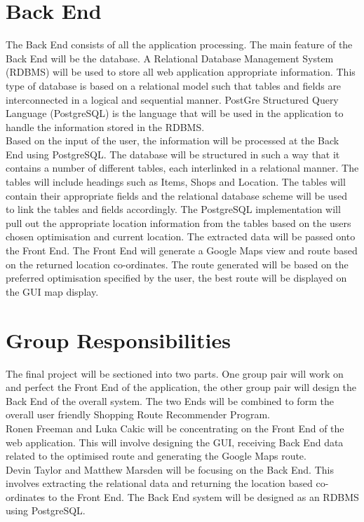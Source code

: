 \documentclass[10pt, a4paper, onecolumn]{scrartcl}
\begin{document}
	\section{Back End}
	
		The Back End consists of all the application processing. The main feature of the Back End will be the database. A Relational Database Management System (RDBMS) will be used to store all web application appropriate information. This type of database is based on a relational model such that tables and fields are interconnected in a logical and sequential manner. PostGre Structured Query Language (PostgreSQL) is the language that will be used in the application to handle the information stored in the RDBMS. \\
	
		Based on the input of the user, the information will be processed at the Back End using PostgreSQL. The database will be structured in such a way that it contains a number of different tables, each interlinked in a relational manner. The tables will include headings such as Items, Shops and Location. The tables will contain their appropriate fields and the relational database scheme will be used to link the tables and fields accordingly. The PostgreSQL implementation will pull out the appropriate location information from the tables based on the users chosen optimisation and current location. The extracted data will be passed onto the Front End. The Front End will generate a Google Maps view and route based on the returned location co-ordinates. The route generated will be based on the preferred optimisation specified by the user, the best route will be displayed on the GUI map display. 
	
	\section{Group Responsibilities}
	
		The final project will be sectioned into two parts. One group pair will work on and perfect the Front End of the application, the other group pair will design the Back End of the overall system. The two Ends will be combined to form the overall user friendly Shopping Route Recommender Program. \\
		
		Ronen Freeman and Luka Cakic will be concentrating on the Front End of the web application. This will involve designing the GUI, receiving Back End data related to the optimised route and generating the Google Maps route. \\
		
		Devin Taylor and Matthew Marsden will be focusing on the Back End. This involves extracting the relational data  and returning the location based co-ordinates to the Front End. The Back End system will be designed as an RDBMS using PostgreSQL.   
	

	
		
		
\end{document}
